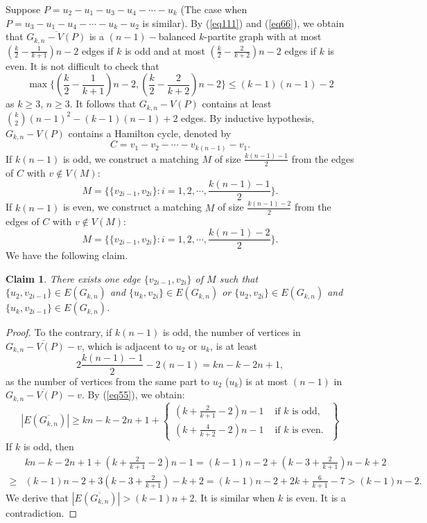 \documentclass[reqno]{amsart}
\newtheorem{claim}[theorem]{Claim}
\begin{document}
Suppose $P=u_2-u_1-u_3-u_4-\cdots-u_k$ (The case when $P=u_3-u_1-u_4-\cdots-u_k-u_2$ is similar).  By  (\ref{eq111}) and (\ref{eq66}), we obtain that $\overline{G_{k,n}-V(P)}$ is a $(n-1)-$balanced $k$-partite graph with at most $\left(\frac{k}{2}-\frac{1}{k+1}\right) n-2$ edges if $k$ is odd and at most $\left(\frac{k}{2}-\frac{2}{k+2}\right) n-2$ edges if $k$ is even. It is not difficult to check that $$\max\Big\{\left(\frac{k}{2}-\frac{1}{k+1}\right) n-2, \left(\frac{k}{2}-\frac{2}{k+2}\right) n-2 \Big\} \leq (k-1)(n-1)-2$$
as  $k \geq 3$, $n \geq 3$. It follows that $G_{k,n}-V(P)$ contains at least $\binom{k}{2}(n-1)^{2}-(k-1)(n-1)+2$ edges. By inductive hypothesis, $G_{k,n}-V(P)$ contains a Hamilton cycle, denoted by $$C = v_1-v_2-\cdots-v_{k(n-1)}-v_1.$$
If $k(n-1)$ is odd, we construct a matching $M$ of size $\frac{k(n-1)-1}{2}$ from the edges of $C$ with $v \notin V(M)$:  $$M=\Big\{\{v_{2i-1},v_{2i}\}: i=1,2,\cdots,\frac{k(n-1)-1}{2}\Big\}.$$
If $k(n-1)$ is even,  we construct a matching $M$ of size $\frac{k(n-1)-2}{2}$ from the edges of $C$ with $v \notin V(M)$:  $$M=\Big\{\{v_{2i-1},v_{2i}\}: i=1,2,\cdots,\frac{k(n-1)-2}{2}\Big\}.$$
We have the following claim.
\begin{claim}\label{claim777}
There exists one edge $\{v_{2i-1},v_{2i}\}$ of $M$ such that $\{u_2,v_{2i-1}\} \in E(G_{k,n})$ and $\{u_k,v_{2i}\}\in E(G_{k,n})$ or $\{u_2,v_{2i}\} \in E(G_{k,n})$ and $\{u_k,v_{2i-1}\}\in E(G_{k,n})$.
\end{claim}
\begin{proof}  To the contrary, if $k(n-1)$ is odd,  the number of vertices in $\overline{G_{k,n}-V(P)-v}$, which is adjacent to $u_2$ or $u_k$,  is at least  $$ 2\frac{k(n-1)-1}{2} - 2(n-1)=kn-k-2n+1,$$
as the number of vertices from the same part to $u_2$ ($u_k$) is at most $(n-1)$ in $\overline{G_{k,n}-V(P)-v}$. By (\ref{eq55}), we obtain:
\begin{equation*} |E(\overline{G_{k,n}})|  \geq kn-k-2n+1+ \left\{\begin{array}{ll}
\left(k+\frac{2}{k+1}-2\right) n-1 & \text { if } k \text { is odd, }  \\
\left(k+\frac{4}{k+2}-2\right) n-1 & \text { if } k \text { is even. }
 \end{array}\right\}
\end{equation*}
If $k$ is odd, then
\begin{align*}
 & kn-k-2n+1+ \left(k+\frac{2}{k+1}-2\right)n-1 = (k-1)n-2+ \left(k-3+\frac{2}{k+1}\right) n-k+2 \\
\geq & (k-1)n-2+ 3\left(k-3+\frac{2}{k+1}\right)-k+2=(k-1)n-2+ 2k+\frac{6}{k+1} -7>  (k-1)n-2.
\end{align*}
We derive that $|E(\overline{G_{k,n}})| > (k-1)n+2$. It is similar when $k$ is even. It is a contradiction.
\end{proof}
\end{document}
